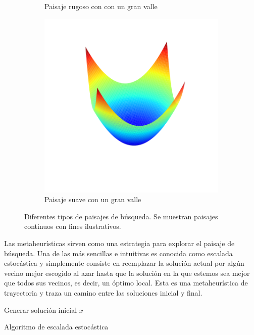 \begin{figure}[H]
\begin{subfigure}{.5\textwidth}
    \caption{Paisaje rugoso con con un gran valle}
\end{subfigure}
\begin{subfigure}{\textwidth}
    \centering
    \includegraphics[scale=.4]{Imagenes/smoothvalley.png}
    \caption{Paisaje suave con un gran valle}
\end{subfigure}
    \label{fig:landtypes}
\caption{Diferentes tipos de paisajes de búsqueda. Se muestran paisajes continuos con fines ilustrativos.}
\end{figure}


Las metaheurísticas sirven como una estrategia para explorar el paisaje de búsqueda. Una de las más sencillas e intuitivas es conocida como escalada estocástica y simplemente consiste en reemplazar la solución actual por algún vecino mejor escogido al azar hasta que la solución en la que estemos sea mejor que todos sus vecinos, es decir, un óptimo local. Esta es una metaheurística de trayectoria y traza un camino entre las soluciones inicial y final.

%
\begin{algorithm}[H]
 Generar solución inicial $x$\;
    \label{alg:LS}
    \caption{Algoritmo de escalada estocástica}
\end{algorithm}

